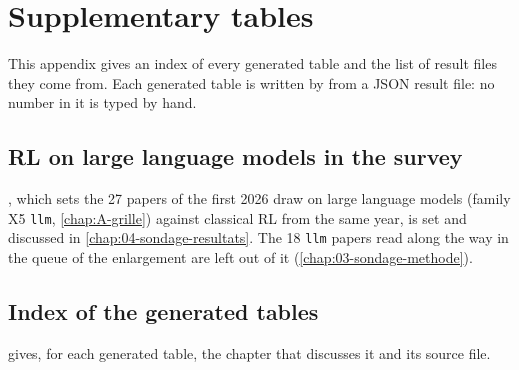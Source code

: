 \chapter{Supplementary tables}
\label{chap:B-tableaux}

This appendix gives an index of every generated table and the list of result files they come from. Each generated table is written by
 from a JSON result file: no number in it is typed by hand.

\section{RL on large language models in the survey}
\label{sec:b-lrl}

, which sets the 27 papers of the first 2026 draw on large language models
(family X5 \texttt{llm}, \cref{chap:A-grille}) against classical RL from the same year, is set and
discussed in \cref{chap:04-sondage-resultats}. The 18 \texttt{llm} papers read along the way in the
queue of the enlargement are left out of it (\cref{chap:03-sondage-methode}).

\section{Index of the generated tables}
\label{sec:b-index}

 gives, for each generated table, the chapter that discusses it and its source file.

